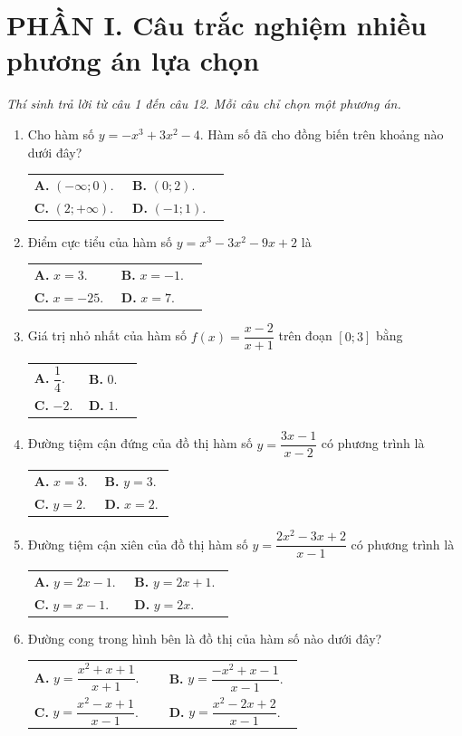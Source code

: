 \documentclass[12pt,a4paper]{article}
\makeatletter
\newcommand{\bonpa}[4]{\par\nobreak\smallskip\nobreak\noindent
\begin{tabular}{@{}p{0.47\linewidth}p{0.47\linewidth}@{}}
\textbf{A.} #1 & \textbf{B.} #2\\[8pt]
\textbf{C.} #3 & \textbf{D.} #4\end{tabular}}
\makeatother
\begin{document}
\section*{\large PHẦN I. Câu trắc nghiệm nhiều phương án lựa chọn}
\textit{Thí sinh trả lời từ câu 1 đến câu 12. Mỗi câu chỉ chọn một phương án.}
\begin{enumerate}
\item Cho hàm số $y=-x^3+3x^2-4$. Hàm số đã cho đồng biến trên khoảng nào dưới đây?
\bonpa{$(-\infty;0)$.}{$(0;2)$.}{$(2;+\infty)$.}{$(-1;1)$.}

\item Điểm cực tiểu của hàm số $y=x^3-3x^2-9x+2$ là
\bonpa{$x=3$.}{$x=-1$.}{$x=-25$.}{$x=7$.}

\item Giá trị nhỏ nhất của hàm số $f(x)=\dfrac{x-2}{x+1}$ trên đoạn $[0;3]$ bằng
\bonpa{$\dfrac{1}{4}$.}{$0$.}{$-2$.}{$1$.}

\item Đường tiệm cận đứng của đồ thị hàm số $y=\dfrac{3x-1}{x-2}$ có phương trình là
\bonpa{$x=3$.}{$y=3$.}{$y=2$.}{$x=2$.}

\item Đường tiệm cận xiên của đồ thị hàm số $y=\dfrac{2x^2-3x+2}{x-1}$ có phương trình là
\bonpa{$y=2x-1$.}{$y=2x+1$.}{$y=x-1$.}{$y=2x$.}

\item Đường cong trong hình bên là đồ thị của hàm số nào dưới đây?
\par\nobreak\smallskip
\begin{minipage}[c]{0.60\linewidth}
\bonpa{$y=\dfrac{x^2+x+1}{x+1}$.}{$y=\dfrac{-x^2+x-1}{x-1}$.}{$y=\dfrac{x^2-x+1}{x-1}$.}{$y=\dfrac{x^2-2x+2}{x-1}$.}
\end{minipage}\hfill
\begin{minipage}[c]{0.38\linewidth}\centering
{}
\end{minipage}
\end{enumerate}
\end{document}
